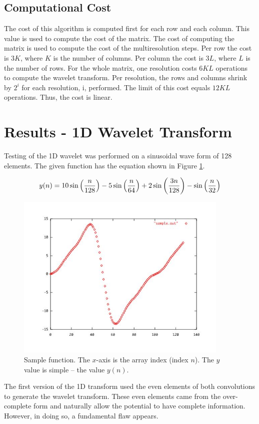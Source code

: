 \subsection {Computational Cost}
The cost of this algorithm is computed first for each row and each column.  This value is used to compute the cost of the matrix. The cost of computing the matrix is used to compute the cost of the multiresolution steps.   Per row the cost is $3K$, where $K$ is the number of columns.  Per column the cost is $3L$, where $L$ is the number of rows.  For the whole matrix, one resolution costs $6KL$ operations to compute the wavelet transform.    Per resolution, the rows and columns shrink by $2^i $ for each resolution, i, performed.  The limit of this cost equals $12KL$ operations.  Thus, the cost is linear.  

\section{Results - 1D Wavelet Transform}
Testing of the 1D wavelet was performed on a sinusoidal wave form of 128 elements.  The given function has the equation shown in Figure \ref{sample}.

\[
y(n) = 10 \sin \left({n \over 128}\right) 
	- 5 \sin \left({n \over 64}\right) 
	+ 2 \sin \left({3 n \over 128}\right)
	- \sin \left({n \over 32}\right)
\]

\begin{figure}
\includegraphics [width=4in]{sample.jpg}
\caption{Sample function.  The $x$-axis is the array index (index $n$).  The $y$ value is simple -- the value $y(n)$. }
\label{sample}
\end{figure}


The first version of the 1D transform used the even elements of both convolutions to generate the wavelet transform.  These even elements came from the over-complete form and naturally allow the potential to have complete information.  However, in doing so, a fundamental flaw appears.


